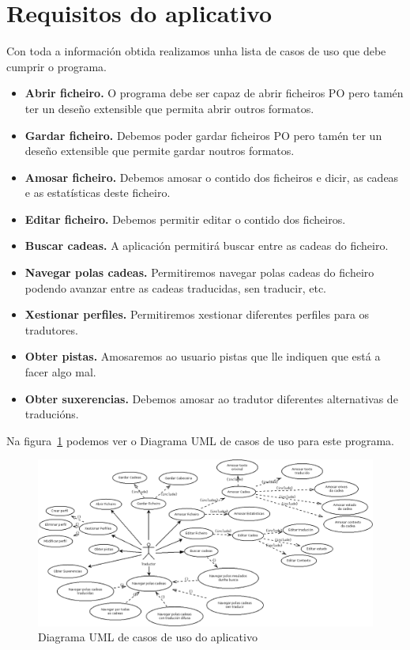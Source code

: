 \section{Requisitos do aplicativo}
Con toda a información obtida realizamos unha lista de casos de uso que debe cumprir o programa.

\begin{itemize}
  \item \textbf{Abrir ficheiro.} O programa debe ser capaz de abrir ficheiros PO pero tamén ter un deseño extensible que permita abrir outros formatos.
  \item \textbf{Gardar ficheiro.} Debemos poder gardar ficheiros PO pero tamén ter un deseño extensible que permite gardar noutros formatos.
  \item \textbf{Amosar ficheiro.} Debemos amosar o contido dos ficheiros e dicir, as cadeas e as estatísticas deste ficheiro.
  \item \textbf{Editar ficheiro.} Debemos permitir editar o contido dos ficheiros.
  \item \textbf{Buscar cadeas.} A aplicación permitirá buscar entre as cadeas do ficheiro.
  \item \textbf{Navegar polas cadeas.} Permitiremos navegar polas cadeas do ficheiro podendo avanzar entre as cadeas traducidas, sen traducir, etc.
  \item \textbf{Xestionar perfiles.} Permitiremos xestionar diferentes perfiles para os tradutores.
  \item \textbf{Obter pistas.} Amosaremos ao usuario pistas que lle indiquen que está a facer algo mal.
  \item \textbf{Obter suxerencias.} Debemos amosar ao tradutor diferentes alternativas de traducións.
\end{itemize}

Na figura~\ref{fig:casosdeuso} podemos ver o Diagrama UML de casos de uso para este programa.

\begin{figure}[h!]
    \centering
    \includegraphics[width=0.9\textheight,angle=90]{img/casosdeuso.png}
    \caption{Diagrama UML de casos de uso do aplicativo}
    \label{fig:casosdeuso}
\end{figure}

%
%
